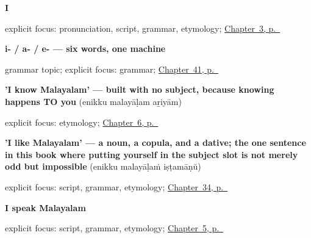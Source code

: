 \noindent\begin{minipage}[t]{\linewidth}
\raggedright
\textbf{I}\enspace\emph{}\par
\footnotesize explicit focus: pronunciation, script, grammar, etymology; \hyperref[ch:responding]{Chapter~3, p.~\pageref*{ch:responding}}
\end{minipage}\par\smallskip

\noindent\begin{minipage}[t]{\linewidth}
\raggedright
\textbf{i- / a- / e- — six words, one machine}\par
\footnotesize grammar topic; explicit focus: grammar; \hyperref[ch:ml-pointing-and-asking]{Chapter~41, p.~\pageref*{ch:ml-pointing-and-asking}}
\end{minipage}\par\smallskip

\noindent\begin{minipage}[t]{\linewidth}
\raggedright
\textbf{'I know Malayalam' — built with no subject, because knowing happens TO you}\enspace\emph{  }\enspace(enikku malayāḷam aṟiyām)\par
\footnotesize explicit focus: etymology; \hyperref[ch:ml-dative-case]{Chapter~6, p.~\pageref*{ch:ml-dative-case}}
\end{minipage}\par\smallskip

\noindent\begin{minipage}[t]{\linewidth}
\raggedright
\textbf{'I like Malayalam' — a noun, a copula, and a dative; the one sentence in this book where putting yourself in the subject slot is not merely odd but impossible}\enspace\emph{  }\enspace(enikku malayāḷaṁ iṣṭamāṇŭ)\par
\footnotesize explicit focus: script, grammar, etymology; \hyperref[ch:ml-taking-asking-helping-liking]{Chapter~34, p.~\pageref*{ch:ml-taking-asking-helping-liking}}
\end{minipage}\par\smallskip

\noindent\begin{minipage}[t]{\linewidth}
\raggedright
\textbf{I speak Malayalam}\enspace\emph{  }\par
\footnotesize explicit focus: script, grammar, etymology; \hyperref[ch:first-verbs]{Chapter~5, p.~\pageref*{ch:first-verbs}}
\end{minipage}\par\smallskip


